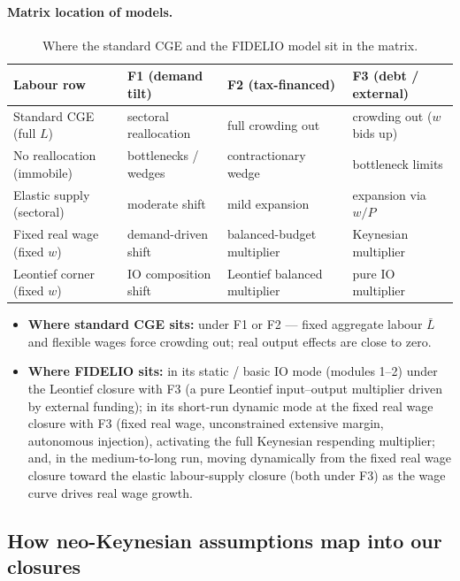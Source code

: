 \paragraph{Matrix location of models.}
\begin{table}[htbp]
\centering
\small
\begin{tabular}{l l l l}
\toprule
Labour row & F1 (demand tilt) & F2 (tax-financed) & F3 (debt / external) \\
\midrule
Standard CGE (full $L$)   & sectoral reallocation & full crowding out & crowding out ($w$ bids up) \\
No reallocation (immobile)& bottlenecks / wedges  & contractionary wedge & bottleneck limits \\
Elastic supply (sectoral) & moderate shift        & mild expansion & expansion via $w/P$ \\
Fixed real wage (fixed $w$)& demand-driven shift   & balanced-budget multiplier & Keynesian multiplier \\
Leontief corner (fixed $w$)& IO composition shift  & Leontief balanced multiplier & pure IO multiplier \\
\bottomrule
\end{tabular}
\caption{Where the standard CGE and the FIDELIO model sit in the matrix.}
\label{tab:matrix-map}
\end{table}

\begin{itemize}
\item \textbf{Where standard CGE sits:} under F1 or F2 --- fixed
  aggregate labour $\bar L$ and flexible wages force crowding out; real output
  effects are close to zero.
\item \textbf{Where FIDELIO sits:} in its static / basic IO mode (modules
  1--2) under the Leontief closure with F3 (a pure Leontief input--output
  multiplier driven by
  external funding); in its short-run dynamic mode at the fixed real wage
  closure with F3 (fixed real
  wage, unconstrained extensive margin, autonomous injection), activating the
  full Keynesian respending multiplier; and, in the medium-to-long run, moving
  dynamically from the fixed real wage closure toward the elastic
  labour-supply closure (both under F3) as the wage curve drives real wage
  growth.
\end{itemize}

\subsection{How neo-Keynesian assumptions map into our closures}\label{app:neokeynesian}

